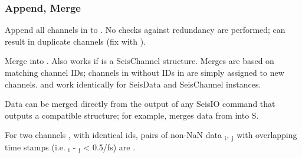 \documentclass[letterpaper,11pt,english]{sphinxmanual}
\begin{document}
\subsubsection{Append, Merge}
\label{\detokenize{src/seisdata:append-merge}}

\begin{fulllineitems}
\end{fulllineitems}


Append all channels in  to . No checks against redundancy are performed; can result in duplicate channels (fix with ).


\begin{fulllineitems}
\end{fulllineitems}



\begin{fulllineitems}
\end{fulllineitems}


Merge  into . Also works if  is a SeisChannel structure. Merges are based on matching channel IDs; channels in  without IDs in  are simply assigned to new channels.  and \sphinxcode{\sphinxupquote{+=}} work identically for SeisData and SeisChannel instances.

Data can be merged directly from the output of any SeisIO command that outputs a compatible structure; for example,  merges data from  into S.

For two channels ,  with identical ids, pairs of non-NaN data $_{\text{i}}$, $_{\text{j}}$ with overlapping time stamps (i.e. \textbar{} $_{\text{i}}$ - $_{\text{j}}$ \textbar{} \textless{} 0.5/fs) are .


\begin{fulllineitems}
\end{fulllineitems}
\end{document}
